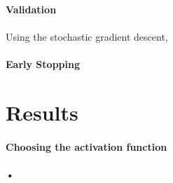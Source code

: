 \documentclass[a4paper]{report}
\begin{document}
\paragraph{Validation}
\paragraph{} Using the stochastic gradient descent, 
\paragraph{Early Stopping}
\section{Results}
\paragraph{Choosing the activation function}
\paragraph{•}
\end{document}
